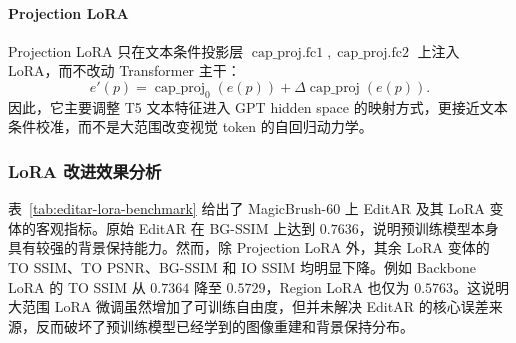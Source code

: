 \documentclass[UTF8,11pt,a4paper,fontset=fandol]{ctexart}
\begin{document}
\paragraph{Projection LoRA}
Projection LoRA 只在文本条件投影层 \(\operatorname{cap\_proj.fc1},\operatorname{cap\_proj.fc2}\) 上注入 LoRA，而不改动 Transformer 主干：
\[
e'(p)=\operatorname{cap\_proj}_{0}(e(p))
+\Delta\operatorname{cap\_proj}(e(p)).
\]
因此，它主要调整 T5 文本特征进入 GPT hidden space 的映射方式，更接近文本条件校准，而不是大范围改变视觉 token 的自回归动力学。

\begin{table}[t]
\centering
\small
\caption{MagicBrush-60 上 EditAR 及其 LoRA 变体的客观指标。TO 表示 Target--Output，IO 表示 Input--Output；Edit Chg. 为编辑区域平均亮度变化。}
\label{tab:editar-lora-benchmark}
\end{table}

\subsubsection{LoRA 改进效果分析}

表~\ref{tab:editar-lora-benchmark} 给出了 MagicBrush-60 上 EditAR 及其 LoRA 变体的客观指标。原始 EditAR 在 BG-SSIM 上达到 \(0.7636\)，说明预训练模型本身具有较强的背景保持能力。然而，除 Projection LoRA 外，其余 LoRA 变体的 TO SSIM、TO PSNR、BG-SSIM 和 IO SSIM 均明显下降。例如 Backbone LoRA 的 TO SSIM 从 \(0.7364\) 降至 \(0.5729\)，Region LoRA 也仅为 \(0.5763\)。这说明大范围 LoRA 微调虽然增加了可训练自由度，但并未解决 EditAR 的核心误差来源，反而破坏了预训练模型已经学到的图像重建和背景保持分布。
\end{document}
